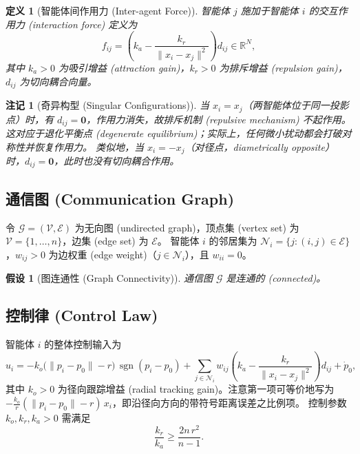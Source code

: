 \documentclass{ctexart}
\DeclareMathOperator{\sgn}{sgn}
\newtheorem{definition}[theorem]{定义}
\newtheorem{remark}[theorem]{注记}
\newtheorem{assumption}[theorem]{假设}
\begin{document}
\begin{definition}[智能体间作用力 (Inter-agent Force)]
智能体 $j$ 施加于智能体 $i$ 的交互作用力 (interaction force) 定义为
\begin{equation}
f_{ij} = \left(k_a - \frac{k_r}{\|x_i - x_j\|^2}\right) d_{ij} \in \mathbb{R}^N,
\end{equation}
其中 $k_a > 0$ 为吸引增益 (attraction gain)，$k_r > 0$ 为排斥增益 (repulsion gain)，$d_{ij}$ 为切向耦合向量。
\end{definition}

\begin{remark}[奇异构型 (Singular Configurations)]
当 $x_i = x_j$（两智能体位于同一投影点）时，有 $d_{ij} = \mathbf{0}$，作用力消失，故排斥机制 (repulsive mechanism) 不起作用。
这对应于退化平衡点 (degenerate equilibrium)；实际上，任何微小扰动都会打破对称性并恢复作用力。
类似地，当 $x_i = -x_j$（对径点，diametrically opposite）时，$d_{ij} = \mathbf{0}$，此时也没有切向耦合作用。
\end{remark}

\subsection*{通信图 (Communication Graph)}

令 $\mathcal{G} = (\mathcal{V}, \mathcal{E})$ 为无向图 (undirected graph)，顶点集 (vertex set) 为 $\mathcal{V} = \{1,\dots,n\}$，边集 (edge set) 为 $\mathcal{E}$。
智能体 $i$ 的邻居集为 $\mathcal{N}_i = \{j : (i,j) \in \mathcal{E}\}$，$w_{ij} > 0$ 为边权重 (edge weight)（$j \in \mathcal{N}_i$），且 $w_{ii} = 0$。

\begin{assumption}[图连通性 (Graph Connectivity)]
通信图 $\mathcal{G}$ 是连通的 (connected)。
\end{assumption}

\subsection*{控制律 (Control Law)}

智能体 $i$ 的整体控制输入为
\begin{equation}
u_i =
-k_o\bigl(\|p_i - p_0\| - r\bigr)\,\sgn(p_i - p_0)
+ \sum_{j \in \mathcal{N}_i} w_{ij} \left(k_a - \frac{k_r}{\|x_i - x_j\|^2}\right) d_{ij}
+ \dot{p}_0,
\label{eq u}
\end{equation}
其中 $k_o > 0$ 为径向跟踪增益 (radial tracking gain)。注意第一项可等价地写为 $-\frac{k_o}{r}(\|p_i - p_0\| - r)\,x_i$，即沿径向方向的带符号距离误差之比例项。
控制参数 $k_o, k_r, k_a > 0$ 需满足
\begin{equation}
\frac{k_r}{k_a} \geq \frac{2n\,r^2}{n-1}.
\label{eq:gain_condition}
\end{equation}
\end{document}
